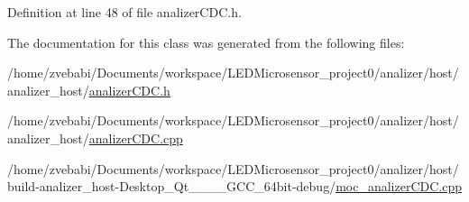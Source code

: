Definition at line 48 of file analizer\+C\+D\+C.\+h.



The documentation for this class was generated from the following files\+:\begin{DoxyCompactItemize}
\item 
/home/zvebabi/\+Documents/workspace/\+L\+E\+D\+Microsensor\+\_\+project0/analizer/host/analizer\+\_\+host/\hyperlink{analizer_c_d_c_8h}{analizer\+C\+D\+C.\+h}\item 
/home/zvebabi/\+Documents/workspace/\+L\+E\+D\+Microsensor\+\_\+project0/analizer/host/analizer\+\_\+host/\hyperlink{analizer_c_d_c_8cpp}{analizer\+C\+D\+C.\+cpp}\item 
/home/zvebabi/\+Documents/workspace/\+L\+E\+D\+Microsensor\+\_\+project0/analizer/host/build-\/analizer\+\_\+host-\/\+Desktop\+\_\+\+Qt\+\_\+\_\+\_\+\_\+\+G\+C\+C\+\_\+64bit-\/debug/\hyperlink{build-analizer__host-_desktop___qt__5__9__0___g_c_c__64bit-debug_2moc__analizer_c_d_c_8cpp}{moc\+\_\+analizer\+C\+D\+C.\+cpp}\end{DoxyCompactItemize}
